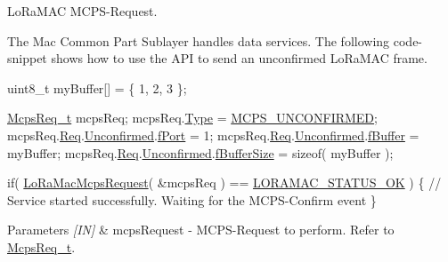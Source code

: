 Lo\+Ra\+M\+AC M\+C\+P\+S-\/\+Request. 

The Mac Common Part Sublayer handles data services. The following code-\/snippet shows how to use the A\+PI to send an unconfirmed Lo\+Ra\+M\+AC frame.


\begin{DoxyCode}
uint8\_t myBuffer[] = \{ 1, 2, 3 \};

\hyperlink{structsMcpsReq}{McpsReq\_t} mcpsReq;
mcpsReq.\hyperlink{structsMcpsReq_a9c0265d5c764fb2b0119c932b896f826}{Type} = \hyperlink{group__LORAMAC_gga7b080a046606f23fe030d0aa6d2a0e30a340afc087e96410da04d07fb0470f84a}{MCPS\_UNCONFIRMED};
mcpsReq.\hyperlink{structsMcpsReq_a36a00aadc44825e3235a1652bd7911d6}{Req}.\hyperlink{unionsMcpsReq_1_1uMcpsParam_a2aae1e6bd0891c17e9bc2654ae95e60a}{Unconfirmed}.\hyperlink{structsMcpsReqUnconfirmed_a3c0190f7a5cc179b8cd664ff6a57169e}{fPort} = 1;
mcpsReq.\hyperlink{structsMcpsReq_a36a00aadc44825e3235a1652bd7911d6}{Req}.\hyperlink{unionsMcpsReq_1_1uMcpsParam_a2aae1e6bd0891c17e9bc2654ae95e60a}{Unconfirmed}.\hyperlink{structsMcpsReqUnconfirmed_a38fff2f3a5d07612c80146613fe86ceb}{fBuffer} = myBuffer;
mcpsReq.\hyperlink{structsMcpsReq_a36a00aadc44825e3235a1652bd7911d6}{Req}.\hyperlink{unionsMcpsReq_1_1uMcpsParam_a2aae1e6bd0891c17e9bc2654ae95e60a}{Unconfirmed}.\hyperlink{structsMcpsReqUnconfirmed_a0e3cfa4780e696a8e262d1f8f9f5fec4}{fBufferSize} = \textcolor{keyword}{sizeof}( myBuffer );

\textcolor{keywordflow}{if}( \hyperlink{group__LORAMAC_ga79768f8a3c22aaff84d4dfcc77ad508c}{LoRaMacMcpsRequest}( &mcpsReq ) == \hyperlink{group__LORAMAC_gga1d18f26b344040b3ec5c3db662919661a03db5fca052313edb3823c014b653a74}{LORAMAC\_STATUS\_OK} )
\{
  \textcolor{comment}{// Service started successfully. Waiting for the MCPS-Confirm event}
\}
\end{DoxyCode}



\begin{DoxyParams}{Parameters}
{\em \mbox{[}\+I\+N\mbox{]}} & mcps\+Request -\/ M\+C\+P\+S-\/\+Request to perform. Refer to \hyperlink{group__LORAMAC_ga038e0fe5eecc1fc4e8165eace8e2e683}{Mcps\+Req\+\_\+t}.\\
\hline
\end{DoxyParams}

